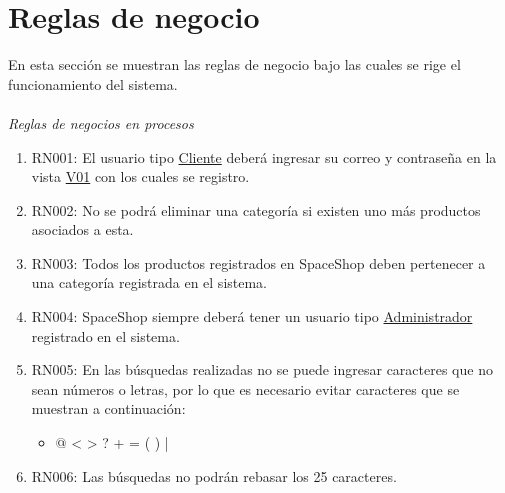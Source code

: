 \chapter{Reglas de negocio}
	En esta secci\'on se muestran las reglas de negocio bajo las cuales se rige el funcionamiento del sistema.\\
	\\
	\textit{\large Reglas de negocios en procesos}
	\begin{enumerate}
		\item RN001: El usuario tipo \hyperlink{Cliente}{Cliente} deber\'a ingresar su correo y contrase\~na en la vista \hyperlink{V01}{V01} con los cuales se registro.
		\item RN002: No se podr\'a eliminar una categor\'ia si existen uno m\'as productos asociados a esta.
		\item RN003: Todos los productos registrados en SpaceShop deben pertenecer a una categor\'ia registrada en el sistema.
		\item RN004: SpaceShop siempre deber\'a tener un usuario tipo \hyperlink{Administrador}{Administrador} registrado en el sistema.
		\item RN005: En las búsquedas realizadas no se puede ingresar caracteres que no sean números o letras, por lo que es necesario evitar caracteres que se muestran a continuaci\'on:
			\begin{itemize}
				\item @ < > ? + = ( ) { } |
			\end{itemize}
		\item RN006: Las búsquedas no podrán rebasar los 25 caracteres.
	\end{enumerate}